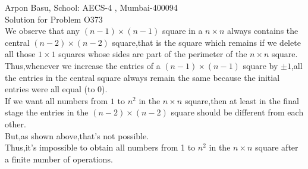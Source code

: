 \documentclass[10pt,a4paper]{extarticle}
\begin{document}
Arpon Basu, School: AECS-4 , Mumbai-400094\\
Solution for Problem O373 \\
We observe that any $(n-1)\times (n-1)$ square in a $n\times n$ always contains the central $(n-2)\times (n-2)$ square,that is the square which remains if we delete all those $1\times 1$ squares whose sides are part of the perimeter of the $n\times n$ square.\\
Thus,whenever we increase the entries of a $(n-1)\times (n-1)$ square by $\pm 1$,all the entries in the central square always remain the same because the initial entries were all equal (to 0).\\
If we want all numbers from $1$ to $n^{2}$ in the $n\times n$ square,then at least in the final stage the entries in the $(n-2)\times (n-2)$ square should be different from each other.\\
But,as shown above,that's not possible.\\
Thus,it's impossible to obtain all numbers from 1 to $n^{2}$ in the $n\times n$ square after a finite number of operations. 
 
\end{document}
